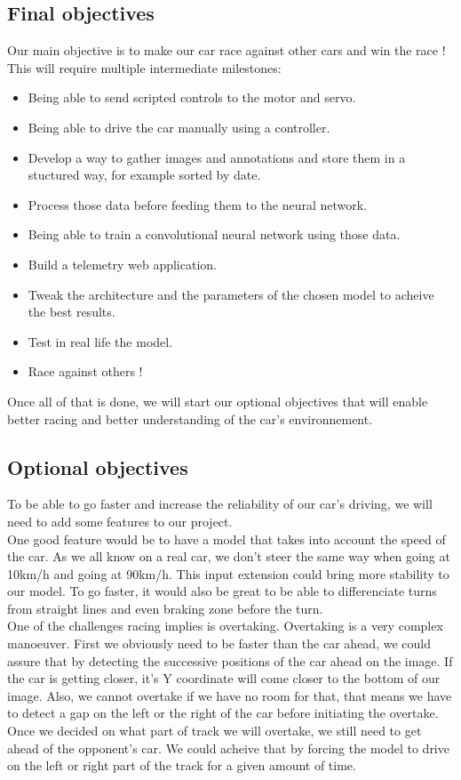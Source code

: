 \documentclass[12pt]{article}
\begin{document}
\subsection{Final objectives}
Our main objective is to make our car race against other cars and win the race !
This will require multiple intermediate milestones:
\begin{itemize}
\item Being able to send scripted controls to the motor and servo.
\item Being able to drive the car manually using a controller.
\item Develop a way to gather images and annotations and store them in a stuctured way, for example sorted by date.
\item Process those data before feeding them to the neural network.
\item Being able to train a convolutional neural network using those data.
\item Build a telemetry web application.
\item Tweak the architecture and the parameters of the chosen model to acheive the best results.
\item Test in real life the model.
\item Race against others !
\end{itemize}
Once all of that is done, we will start our optional objectives that will enable better racing and better understanding of the car's environnement.

\subsection{Optional objectives}
To be able to go faster and increase the reliability of our car's driving, we will need to add some features to our project. \\

One good feature would be to have a model that takes into account the speed of the car. As we all know on a real car, we don't steer the same way when going at 10km/h and going at 90km/h. This input extension could bring more stability to our model.
To go faster, it would also be great to be able to differenciate turns from straight lines and even braking zone before the turn. \\

One of the challenges racing implies is overtaking. Overtaking is a very complex manoeuver. First we obviously need to be faster than the car ahead, we could assure that by detecting the successive positions of the car ahead on the image. If the car is getting closer, it's Y coordinate will come closer to the bottom of our image. Also, we cannot overtake if we have no room for that, that means we have to detect a gap on the left or the right of the car before initiating the overtake. Once we decided on what part of track we will overtake, we still need to get ahead of the opponent's car. We could acheive that by forcing the model to drive on the left or right part of the track for a given amount of time.
\newpage
\end{document}
